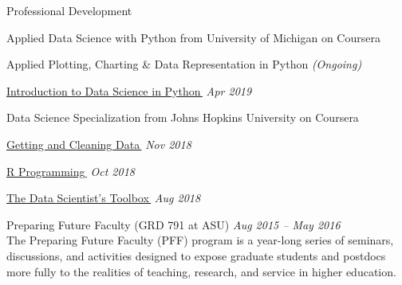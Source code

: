 \begin{rBulletSection}{Professional Development}

  \item Applied Data Science with Python from University of Michigan on Coursera

    \begin{rBulletList}

      \item Applied Plotting, Charting \& Data Representation in Python \hfill \emph{(Ongoing)}

      \item \href{https://www.coursera.org/account/accomplishments/certificate/UDBPYUJL4G5K}{Introduction to Data
        Science in Python\,} \hfill \emph{Apr 2019}


    \end{rBulletList}

  \item Data Science Specialization from Johns Hopkins University on Coursera

    \begin{rBulletList}

      \item \href{https://www.coursera.org/account/accomplishments/certificate/H8HZ695QZAV9}{Getting and Cleaning
        Data\,} \hfill \emph{Nov 2018}

      \item \href{https://www.coursera.org/account/accomplishments/certificate/742MSB39CNJN}{R Programming\,} \hfill
        \emph{Oct 2018}

      \item \href{https://www.coursera.org/account/accomplishments/certificate/EGS9V3KRQPP9}{The Data Scientist's
        Toolbox\,} \hfill \emph{Aug 2018}

    \end{rBulletList}


  \item Preparing Future Faculty (GRD 791 at ASU) \hfill \emph{Aug 2015 -- May 2016}\\
    The Preparing Future Faculty (PFF) program is a year-long series of seminars, discussions, and activities designed to expose graduate students and postdocs more fully to the realities of teaching, research, and service in higher education.

\end{rBulletSection}
